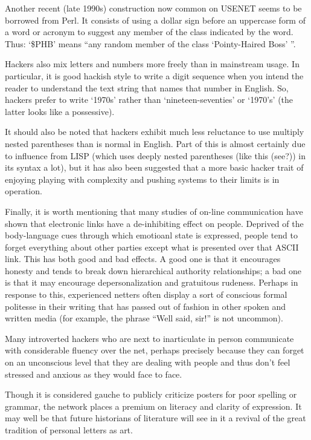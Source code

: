 Another recent (late 1990s) construction now common on USENET seems to be borrowed from Perl. It consists of using a dollar sign before an
uppercase form of a word or acronym to suggest any  member of the class indicated by the word. Thus: `\$PHB' means ``any
random member of the class `Pointy-Haired Boss' ''.

Hackers also mix letters and numbers more freely than in mainstream usage. In particular, it is good hackish style to write a digit
sequence when you intend the reader to understand the text string that names that number in English. So, hackers prefer to write `1970s'
rather than `nineteen-seventies' or `1970's' (the latter looks like a possessive).

It should also be noted that hackers exhibit much less reluctance to use multiply nested parentheses than is normal in English. Part of
this is almost certainly due to influence from LISP (which uses deeply nested parentheses (like this (see?)) in its syntax a lot), but it
has also been suggested that a more basic hacker trait of enjoying playing with complexity and pushing systems to their limits is in
operation.

Finally, it is worth mentioning that many studies of on-line communication have shown that electronic links have a de-inhibiting effect on
people. Deprived of the body-language cues through which emotioanl state is expressed, people tend to forget everything about other parties
except what is presented over that ASCII link. This has both good and bad effects. A good one is that it encourages honesty and tends to
break down hierarchical authority relationships; a bad one is that it may encourage depersonalization and gratuitous rudeness. Perhaps in
response to this, experienced netters often display a sort of conscious formal politesse in their writing that has passed out of fashion in
other spoken and written media (for example, the phrase ``Well said, sir!'' is not uncommon).

Many introverted hackers who are next to inarticulate in person communicate with considerable fluency over the net, perhaps precisely
because they can forget on an unconscious level that they are dealing with people and thus don't feel stressed and anxious as they would
face to face.

Though it is considered gauche to publicly criticize posters for poor spelling or grammar, the network places a premium on literacy and
clarity of expression. It may well be that future historians of literature will see in it a revival of the great tradition of personal
letters as art.

